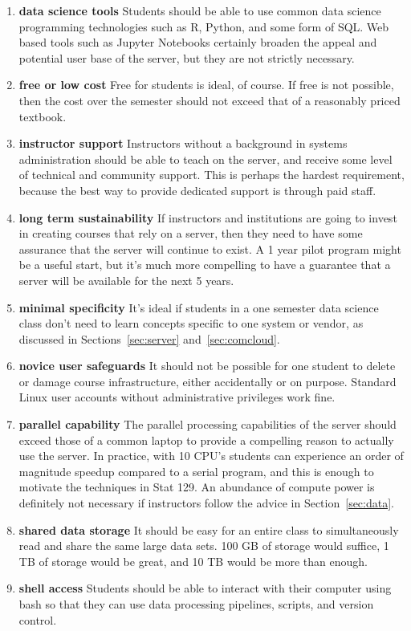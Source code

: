 \documentclass[12pt]{article}
\begin{document}
\begin{enumerate}
\item \textbf{data science tools} Students should be able to use common data science programming technologies such as R, Python, and some form of SQL.
    Web based tools such as Jupyter Notebooks certainly broaden the appeal and potential user base of the server, but they are not strictly necessary.
\item \textbf{free or low cost} Free for students is ideal, of course.
    If free is not possible, then the cost over the semester should not exceed that of a reasonably priced textbook.
\item \textbf{instructor support}
    Instructors without a background in systems administration should be able to teach on the server, and receive some level of technical and community support.
    This is perhaps the hardest requirement, because the best way to provide dedicated support is through paid staff.
\item \textbf{long term sustainability} 
    If instructors and institutions are going to invest in creating courses that rely on a server, then they need to have some assurance that the server will continue to exist.
    A 1 year pilot program might be a useful start, but it's much more compelling to have a guarantee that a server will be available for the next 5 years.
\item \textbf{minimal specificity}
    It's ideal if students in a one semester data science class don't need to learn concepts specific to one system or vendor, as discussed in Sections~\ref{sec:server} and~\ref{sec:comcloud}.
\item \textbf{novice user safeguards} It should not be possible for one student to delete or damage course infrastructure, either accidentally or on purpose.
    Standard Linux user accounts without administrative privileges work fine.
\item \textbf{parallel capability}
    The parallel processing capabilities of the server should exceed those of a common laptop to provide a compelling reason to actually use the server.
    In practice, with 10 CPU's students can experience an order of magnitude speedup compared to a serial program, and this is enough to motivate the techniques in Stat 129.
    An abundance of compute power is definitely not necessary if instructors follow the advice in Section~\ref{sec:data}.
\item \textbf{shared data storage} It should be easy for an entire class to simultaneously read and share the same large data sets.
    100 GB of storage would suffice, 1 TB of storage would be great, and 10 TB would be more than enough.
\item \textbf{shell access} Students should be able to interact with their computer using bash so that they can use data processing pipelines, scripts, and version control.
\end{enumerate}
\end{document}

